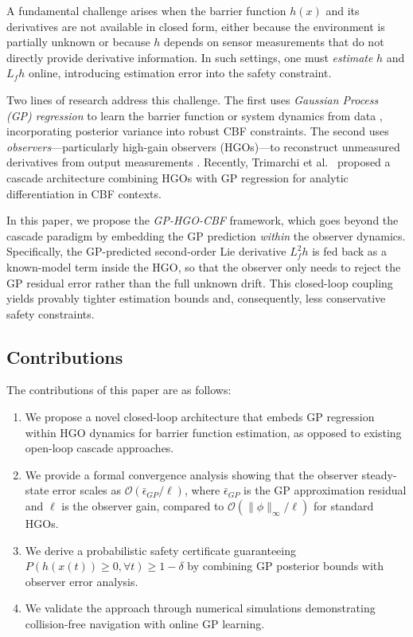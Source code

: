 \documentclass[letterpaper, 10 pt, conference]{ieeeconf}
\begin{document}
A fundamental challenge arises when the barrier function $h(x)$ and its derivatives are not available in closed form, either because the environment is partially unknown or because $h$ depends on sensor measurements that do not directly provide derivative information. In such settings, one must \emph{estimate} $h$ and $L_f h$ online, introducing estimation error into the safety constraint.

Two lines of research address this challenge. The first uses \emph{Gaussian Process (GP) regression} to learn the barrier function or system dynamics from data \cite{jagtap2020gpcbf, castaneda2021pointwise, castaneda2022recursive}, incorporating posterior variance into robust CBF constraints. The second uses \emph{observers}---particularly high-gain observers (HGOs)---to reconstruct unmeasured derivatives from output measurements \cite{khalil2017hgo}. Recently, Trimarchi et al.\ \cite{trimarchi2022hgogp} proposed a cascade architecture combining HGOs with GP regression for analytic differentiation in CBF contexts.

In this paper, we propose the \emph{GP-HGO-CBF} framework, which goes beyond the cascade paradigm by embedding the GP prediction \emph{within} the observer dynamics. Specifically, the GP-predicted second-order Lie derivative $L_f^2 h$ is fed back as a known-model term inside the HGO, so that the observer only needs to reject the GP residual error rather than the full unknown drift. This closed-loop coupling yields provably tighter estimation bounds and, consequently, less conservative safety constraints.

\subsection{Contributions}
The contributions of this paper are as follows:
\begin{enumerate}
    \item We propose a novel closed-loop architecture that embeds GP regression within HGO dynamics for barrier function estimation, as opposed to existing open-loop cascade approaches.
    \item We provide a formal convergence analysis showing that the observer steady-state error scales as $\mathcal{O}(\bar{\epsilon}_{GP}/\ell)$, where $\bar{\epsilon}_{GP}$ is the GP approximation residual and $\ell$ is the observer gain, compared to $\mathcal{O}(\|\phi\|_\infty/\ell)$ for standard HGOs.
    \item We derive a probabilistic safety certificate guaranteeing $P(h(x(t)) \geq 0, \forall t) \geq 1 - \delta$ by combining GP posterior bounds with observer error analysis.
    \item We validate the approach through numerical simulations demonstrating collision-free navigation with online GP learning.
\end{enumerate}
\end{document}
